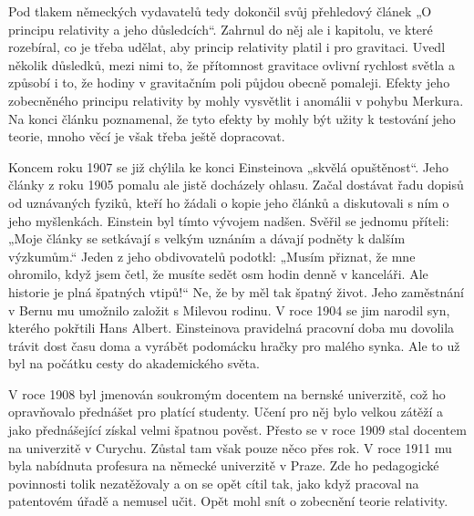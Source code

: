   Pod tlakem německých vydavatelů tedy dokončil svůj přehledový článek „O principu relativity a jeho
  důsledcích“. Zahrnul do něj ale i kapitolu, ve které rozebíral, co je třeba udělat, aby princip
  relativity platil i pro gravitaci. Uvedl několik důsledků, mezi nimi to, že přítomnost gravitace
  ovlivní rychlost světla a způsobí i to, že hodiny v gravitačním poli půjdou obecně pomaleji.
  Efekty jeho zobecněného principu relativity by mohly vysvětlit i anomálii v pohybu Merkura. Na
  konci článku poznamenal, že tyto efekty by mohly být užity k testování jeho teorie, mnoho věcí je
  však třeba ještě dopracovat. 
  
  Koncem roku 1907 se již chýlila ke konci Einsteinova „skvělá opuštěnost“. Jeho články z roku 1905
  pomalu ale jistě docházely ohlasu. Začal dostávat řadu dopisů od uznávaných fyziků, kteří ho
  žádali o kopie jeho článků a diskutovali s ním o jeho myšlenkách. Einstein byl tímto vývojem
  nadšen. Svěřil se jednomu příteli: „Moje články se setkávají s velkým uznáním a dávají podněty k
  dalším výzkumům.“ Jeden z jeho obdivovatelů podotkl: „Musím přiznat, že mne ohromilo, když jsem
  četl, že musíte sedět osm hodin denně v kanceláři. Ale historie je plná špatných vtipů!“ Ne, že by
  měl tak špatný život. Jeho zaměstnání v Bernu mu umožnilo založit s Milevou rodinu. V roce 1904 se
  jim narodil syn, kterého pokřtili Hans Albert. Einsteinova pravidelná pracovní doba mu dovolila
  trávit dost času doma a vyrábět podomácku hračky pro malého synka. Ale to už byl na počátku cesty
  do akademického světa. 
  
  V roce 1908 byl jmenován soukromým docentem na bernské univerzitě, což ho opravňovalo přednášet
  pro platící studenty. Učení pro něj bylo velkou zátěží a jako přednášející získal velmi špatnou
  pověst. Přesto se v roce 1909 stal docentem na univerzitě v Curychu. Zůstal tam však pouze něco
  přes rok. V roce 1911 mu byla nabídnuta profesura na německé univerzitě v Praze. Zde ho
  pedagogické povinnosti tolik nezatěžovaly a on se opět cítil tak, jako když pracoval na patentovém
  úřadě a nemusel učit. Opět mohl snít o zobecnění teorie relativity.

